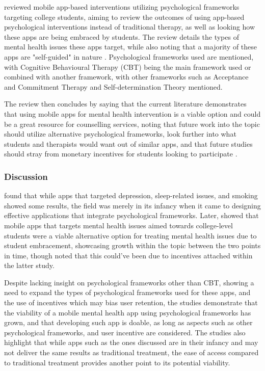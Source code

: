 \documentclass[12pt]{article}
\begin{document}
 reviewed mobile app-based 
interventions utilizing psychological frameworks targeting college students, aiming to review the outcomes of 
using app-based psychological interventions instead of traditional therapy, as well as looking how these apps are 
being embraced by students. The review details the types of mental health issues these apps target, while also 
noting that a majority of these apps are "self-guided" in nature 
. Psychological frameworks used are mentioned, with 
Cognitive Behavioural Therapy (CBT) being 
the main framework used or combined with another framework, with other frameworks such as 
Acceptance and Commitment Therapy and Self-determination Theory mentioned. \newline

The review then concludes by saying that the current literature demonstrates that using mobile apps for mental
health intervention is a viable option and could be a great resource for
counselling services, noting that future work into the topic should utilize alternative psychological
frameworks, look further into what students and therapists would want out of similar apps, and that
future studies should stray from monetary incentives for students looking to participate
.

\subsubsection{Discussion}
 found that while apps that targeted
depression, sleep-related issues, and smoking showed some results, the field was merely in its infancy when it
came to designing effective applications that integrate psychological frameworks. Later, 
showed that mobile apps 
that targets mental health issues aimed towards college-level students were a viable alternative option for 
treating mental health issues due to student embracement, showcasing growth within the topic between the two points
in time, though noted that this could've been due to incentives attached within the latter study. \newline

Despite lacking insight on psychological frameworks other than CBT,
showing a need to expand the types of psychological frameworks used for these apps, and the use of incentives 
which may bias user retention, the studies demonstrate that the viability of a mobile mental health app
using psychological frameworks has grown, and that developing such app is doable, as long
as aspects such as other psychological frameworks, and user incentive are considered. The studies also highlight that
while apps such as the ones discussed are in their infancy and may not deliver the same results as traditional treatment, the
ease of access compared to traditional treatment provides another point to its potential viability.
\end{document}
